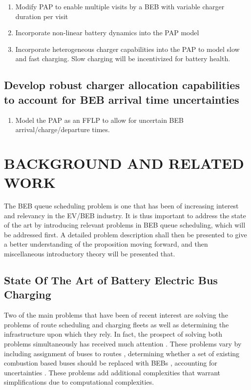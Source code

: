 \documentclass[ee,msthesis]{usuthesis}
\begin{document}
\begin{enumerate}
\item Modify PAP to enable multiple visits by a BEB with variable charger duration per visit

\item Incorporate non-linear battery dynamics into the PAP model

\item Incorporate heterogeneous charger capabilities into the PAP to model slow and fast charging. Slow charging will be
incentivized for battery health.
\end{enumerate}

\section{Develop robust charger allocation capabilities to account for BEB arrival time uncertainties}
\label{sec:obj-math-model-robust}
\begin{enumerate}
\item Model the PAP as an FFLP to allow for uncertain BEB arrival/charge/departure times.
\end{enumerate}
\chapter{BACKGROUND AND RELATED WORK}
\label{sec:background-and-related-work}
The BEB queue scheduling problem is one that has been of increasing interest and relevancy in the EV/BEB industry. It is
thus important to address the state of the art by introducing relevant problems in BEB queue scheduling, which will be
addressed first. A detailed problem description shall then be presented to give a better understanding of the
proposition moving forward, and then miscellaneous introductory theory will be presented that.

\section{State Of The Art of Battery Electric Bus Charging}
\label{sec:state-of-the-art}
Two of the main problems that have been of recent interest are solving the problems of route scheduling and charging
fleets as well as determining the infrastructure upon which they rely. In fact, the prospect of solving both problems
simultaneously has received much attention \cite{wei-2018-optim-spatio,sebastiani-2016-evaluat-elect,hoke-2014-accoun-lithium,wang-2017-elect-vehic}. These problems vary by including assignment of buses to routes
\cite{rinaldi-2020-mixed-fleet,zhou-2020-collab-optim,tang-2019-robus-sched,li-2014-trans-bus}, determining
whether a set of existing combustion based buses should be replaced with BEBs \cite{zhou-2020-bi-objec,duan-2021-refor-mixed,rinaldi-2020-mixed-fleet,zhou-2020-collab-optim}, accounting for uncertainties
\cite{bie-2021-optim-elect,duan-2021-refor-mixed,tang-2019-robus-sched,ursavas-2016-optim-polic}. These problems
add additional complexities that warrant simplifications due to computational complexities.
\end{document}
